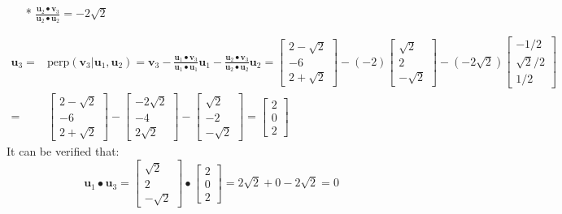 \documentclass{article}
\begin{document}
\begin{description}
\begin{itemize}
\item[*] \(\frac{\mathbf{u}_2 \bullet \mathbf{v}_3}{\mathbf{u}_2 \bullet \mathbf{u}_2} = -2\sqrt{2}\)
\end{itemize}
\begin{align*}
\mathbf{u}_3 = & \text{perp}(\mathbf{v}_3 | \mathbf{u}_1, \mathbf{u}_2) = \mathbf{v}_3 - \frac{\mathbf{u}_1 \bullet \mathbf{v}_3}{\mathbf{u}_1 \bullet \mathbf{u}_1}\mathbf{u}_1 - \frac{\mathbf{u}_2 \bullet \mathbf{v}_3}{\mathbf{u}_2 \bullet \mathbf{u}_2}\mathbf{u}_2 
= \begin{bmatrix} 2 - \sqrt{2} \\ -6 \\ 2 + \sqrt{2} \end{bmatrix} - (-2)\begin{bmatrix} \sqrt{2} \\ 2 \\ -\sqrt{2} \end{bmatrix} - (-2\sqrt{2})\begin{bmatrix} -1/2 \\ \sqrt{2}/2 \\ 1/2 \end{bmatrix} \\
= & \begin{bmatrix} 2 - \sqrt{2} \\ -6 \\ 2 + \sqrt{2} \end{bmatrix} - \begin{bmatrix} -2\sqrt{2} \\ -4 \\ 2\sqrt{2} \end{bmatrix} - \begin{bmatrix} \sqrt{2} \\ -2 \\ -\sqrt{2} \end{bmatrix} 
= \begin{bmatrix} 2 \\ 0 \\ 2 \end{bmatrix} 
\end{align*}
It can be verified that:
\[\mathbf{u}_1 \bullet \mathbf{u}_3 = \begin{bmatrix} \sqrt{2} \\ 2 \\ -\sqrt{2} \end{bmatrix} \bullet \begin{bmatrix} 2 \\ 0 \\ 2 \end{bmatrix} = 2\sqrt{2} + 0 - 2\sqrt{2} = 0\]

\end{description}
\end{document}
